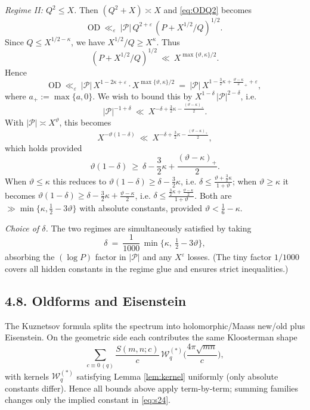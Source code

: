 \documentclass[11pt]{article}
\theoremstyle{definition}
\theoremstyle{remark}
\begin{document}
\smallskip
\noindent\emph{Regime II: $Q^2\le X$.} Then $(Q^2+X)\asymp X$ and \eqref{eq:ODQ2} becomes
\[
\mathrm{OD}\ \ll_\varepsilon\ |\mathcal P|\, Q^{2+\varepsilon}\,(P+X^{1/2}/Q)^{1/2}.
\]
Since $Q\le X^{1/2-\kappa}$, we have $X^{1/2}/Q\ge X^\kappa$. Thus
\[
(P+X^{1/2}/Q)^{1/2}\ \ll\ X^{\max\{\vartheta,\kappa\}/2}.
\]
Hence
\[
\mathrm{OD}\ \ll_\varepsilon\ |\mathcal P|\, X^{1-2\kappa+\varepsilon}\cdot X^{\max\{\vartheta,\kappa\}/2}
\ =\ |\mathcal P|\, X^{1-\frac32\kappa+\frac{\vartheta-\kappa}{2}_+ +\varepsilon},
\]
where $a_+:=\max\{a,0\}$. We wish to bound this by $X^{1-\delta}\,|\mathcal P|^{2-\delta}$, i.e.
\[
|\mathcal P|^{-1+\delta}\ \ll\ X^{-\delta + \frac32\kappa - \frac{(\vartheta-\kappa)_+}{2}}.
\]
With $|\mathcal P|\asymp X^\vartheta$, this becomes
\[
X^{-\vartheta(1-\delta)}\ \ll\ X^{-\delta + \frac32\kappa - \frac{(\vartheta-\kappa)_+}{2}},
\]
which holds provided
\[
\vartheta(1-\delta)\ \ge\ \delta - \frac32\kappa + \frac{(\vartheta-\kappa)_+}{2}.
\]
When $\vartheta\le\kappa$ this reduces to $\vartheta(1-\delta)\ge \delta-\frac32\kappa$, i.e. $\delta\le \frac{\vartheta+\frac32\kappa}{1+\vartheta}$; when $\vartheta\ge\kappa$ it becomes $\vartheta(1-\delta)\ge \delta-\frac32\kappa + \frac{\vartheta-\kappa}{2}$, i.e. $\delta\le \frac{\frac32\kappa+\frac{\vartheta-\kappa}{2}}{1+\vartheta}$.
Both are $\gg \min\{\kappa,\tfrac12-3\vartheta\}$ with absolute constants, provided $\vartheta<\tfrac16-\kappa$.

\smallskip
\noindent\emph{Choice of $\delta$.} The two regimes are simultaneously satisfied by taking
\[
\delta\ =\ \frac{1}{1000}\,\min\!\Big\{\kappa,\ \tfrac12-3\vartheta\Big\},
\]
absorbing the $(\log P)$ factor in $|\mathcal P|$ and any $X^\varepsilon$ losses. (The tiny factor $1/1000$ covers all hidden constants in the regime glue and ensures strict inequalities.)

\subsection*{4.8. Oldforms and Eisenstein}
The Kuznetsov formula splits the spectrum into holomorphic/Maass new/old plus Eisenstein. On the geometric side each contributes the same Kloosterman shape
\[
\sum_{c\equiv 0\,(q)} \frac{S(m,n;c)}{c}\,\mathcal W^{(*)}_q\!\Big(\frac{4\pi\sqrt{mn}}{c}\Big),
\]
with kernels $\mathcal W^{(*)}_q$ satisfying Lemma \ref{lem:kernel} uniformly (only absolute constants differ). Hence all bounds above apply term-by-term; summing families changes only the implied constant in \eqref{eq:s24}.
\end{document}
